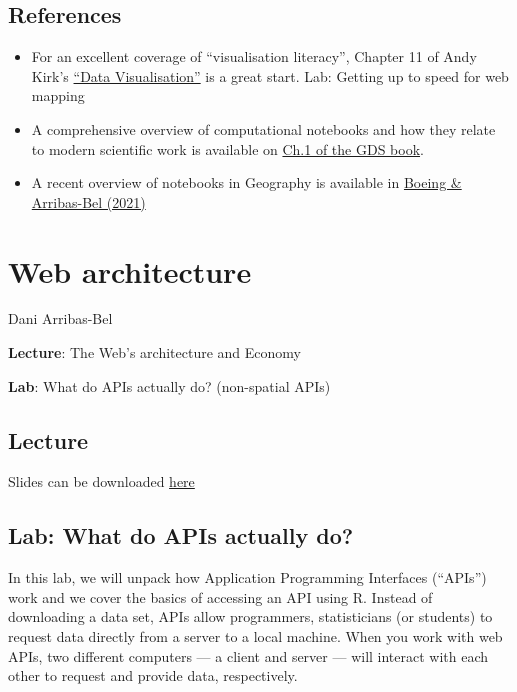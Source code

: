 \documentclass[
  letterpaper,
  DIV=11,
  numbers=noendperiod]{scrreprt}
\providecommand{\tightlist}{%
  \setlength{\itemsep}{0pt}\setlength{\parskip}{0pt}}\usepackage{longtable,booktabs,array}
\begin{document}
\hypertarget{references}{%
\section{References}\label{references}}

\begin{itemize}
\tightlist
\item
  For an excellent coverage of ``visualisation literacy'', Chapter 11 of
  Andy Kirk's \href{https://www.visualisingdata.com/book/}{``Data
  Visualisation''} is a great start. Lab: Getting up to speed for web
  mapping
\item
  A comprehensive overview of computational notebooks and how they
  relate to modern scientific work is available on
  \href{https://geographicdata.science/book/notebooks/01_geo_thinking.html}{Ch.1
  of the GDS book}.
\item
  A recent overview of notebooks in Geography is available in
  \href{https://gistbok.ucgis.org/bok-topics/gis-and-computational-notebooks}{Boeing
  \& Arribas-Bel (2021)}
\end{itemize}


\hypertarget{web-architecture}{%
\chapter{Web architecture}\label{web-architecture}}

Dani Arribas-Bel

\textbf{Lecture}: The Web's architecture and Economy

\textbf{Lab}: What do APIs actually do? (non-spatial APIs)

\hypertarget{lecture-1}{%
\section{Lecture}\label{lecture-1}}

Slides can be downloaded
\href{https://github.com/GDSL-UL/wma/raw/main/pdf/lecture_02.pdf}{here}

\hypertarget{lab-what-do-apis-actually-do}{%
\section{Lab: What do APIs actually
do?}\label{lab-what-do-apis-actually-do}}

In this lab, we will unpack how Application Programming Interfaces
(``APIs'') work and we cover the basics of accessing an API using R.
Instead of downloading a data set, APIs allow programmers, statisticians
(or students) to request data directly from a server to a local machine.
When you work with web APIs, two different computers --- a client and
server --- will interact with each other to request and provide data,
respectively.
\end{document}

